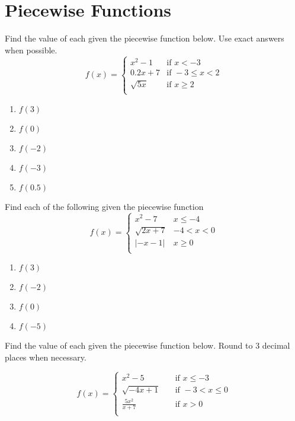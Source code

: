 \newpage

\section{Piecewise Functions}

Find the value of each given the piecewise function below. Use exact answers when possible.
\[
f(x) = \begin{cases}
    x^2-1   &\text{if } x < -3 \\
    0.2x+7  &\text{if } -3 \leq x < 2   \\
    \sqrt{5x}   &\text{if } x \geq 2    \\
\end{cases}
\]
\begin{enumerate}
\item $f(3)$
\item $f(0)$
\item $f(-2)$
\item $f(-3)$
\item $f(0.5)$
\setcounter{Review}{\value{enumi}}
\end{enumerate}

Find each of the following given the piecewise function
\[f(x) = 
\begin{cases}
x^2-7 & x \leq -4 \\
\sqrt{2x+7} & -4 < x < 0 \\
|-x-1| & x \geq 0 \\
\end{cases}
\]
\begin{enumerate}	\setcounter{enumi}{\value{Review}}
\item $f(3)$
\item $f(-2)$
\item $f(0)$
\item $f(-5)$
\setcounter{Review}{\value{enumi}}
\end{enumerate}

Find the value of each given the piecewise function below. Round to 3 decimal places when necessary.

\[
 f(x) = 
 \begin{cases}
    x^2 - 5 \quad &\text{if } x \leq -3 \\[6pt]
    
    \sqrt{-4x + 1} \quad &\text{if } -3 < x \leq 0 \\[6pt]
    
    \frac{5x^2}{x+7} \quad &\text{if } x > 0 \\
 \end{cases}
\]

